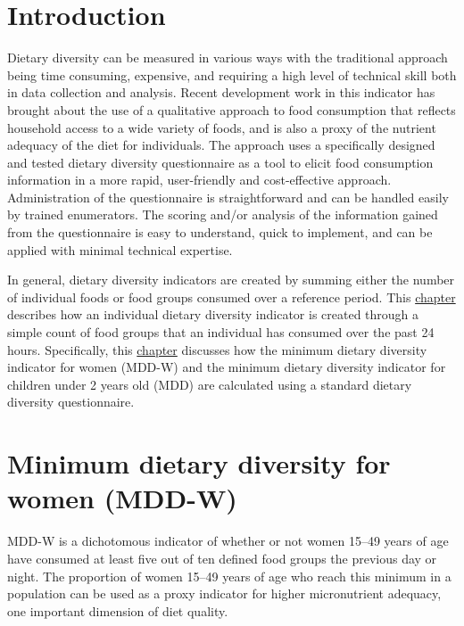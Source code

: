 \documentclass[12pt,]{book}
\theoremstyle{definition}
\theoremstyle{definition}
\theoremstyle{definition}
\theoremstyle{remark}
\begin{document}
\hypertarget{introduction-1}{%
\section{Introduction}\label{introduction-1}}

Dietary diversity can be measured in various ways with the traditional
approach being time consuming, expensive, and requiring a high level of
technical skill both in data collection and analysis. Recent development
work in this indicator has brought about the use of a qualitative
approach to food consumption that reflects household access to a wide
variety of foods, and is also a proxy of the nutrient adequacy of the
diet for individuals. The approach uses a specifically designed and
tested dietary diversity questionnaire as a tool to elicit food
consumption information in a more rapid, user-friendly and
cost-effective approach. Administration of the questionnaire is
straightforward and can be handled easily by trained enumerators. The
scoring and/or analysis of the information gained from the questionnaire
is easy to understand, quick to implement, and can be applied with
minimal technical expertise.

In general, dietary diversity indicators are created by summing either
the number of individual foods or food groups consumed over a reference
period. This \protect\hyperlink{diet}{chapter} describes how an
individual dietary diversity indicator is created through a simple count
of food groups that an individual has consumed over the past 24 hours.
Specifically, this \protect\hyperlink{diet}{chapter} discusses how the
minimum dietary diversity indicator for women (MDD-W) and the minimum
dietary diversity indicator for children under 2 years old (MDD) are
calculated using a standard dietary diversity questionnaire.

\hypertarget{minimum-dietary-diversity-for-women-mdd-w}{%
\section{Minimum dietary diversity for women
(MDD-W)}\label{minimum-dietary-diversity-for-women-mdd-w}}

MDD-W is a dichotomous indicator of whether or not women 15--49 years of
age have consumed at least five out of ten defined food groups the
previous day or night. The proportion of women 15--49 years of age who
reach this minimum in a population can be used as a proxy indicator for
higher micronutrient adequacy, one important dimension of diet quality.
\end{document}
